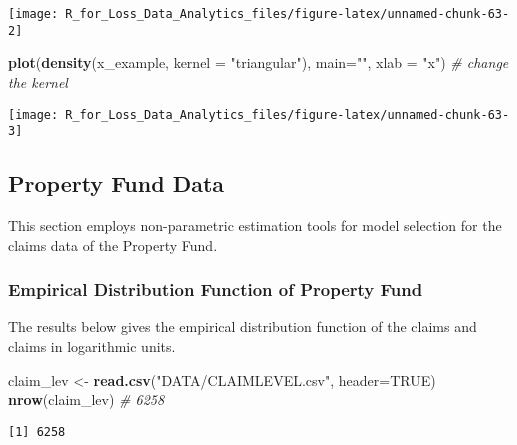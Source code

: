 \documentclass[]{book}
\newenvironment{Shaded}{\begin{snugshade}}{\end{snugshade}}
\newcommand{\KeywordTok}[1]{\textcolor[rgb]{0.13,0.29,0.53}{\textbf{#1}}}
\newcommand{\DataTypeTok}[1]{\textcolor[rgb]{0.13,0.29,0.53}{#1}}
\newcommand{\StringTok}[1]{\textcolor[rgb]{0.31,0.60,0.02}{#1}}
\newcommand{\CommentTok}[1]{\textcolor[rgb]{0.56,0.35,0.01}{\textit{#1}}}
\newcommand{\OtherTok}[1]{\textcolor[rgb]{0.56,0.35,0.01}{#1}}
\newcommand{\NormalTok}[1]{#1}
\theoremstyle{definition}
\theoremstyle{definition}
\theoremstyle{definition}
\theoremstyle{remark}
\begin{document}
\begin{center}\texttt{[image: R\_for\_Loss\_Data\_Analytics\_files/figure-latex/unnamed-chunk-63-2]} \end{center}

\begin{Shaded}
\begin{Highlighting}[]
\KeywordTok{plot}\NormalTok{(}\KeywordTok{density}\NormalTok{(x_example, }\DataTypeTok{kernel =} \StringTok{"triangular"}\NormalTok{), }\DataTypeTok{main=}\StringTok{""}\NormalTok{, }\DataTypeTok{xlab =} \StringTok{"x"}\NormalTok{)  }\CommentTok{# change the kernel}
\end{Highlighting}
\end{Shaded}

\begin{center}\texttt{[image: R\_for\_Loss\_Data\_Analytics\_files/figure-latex/unnamed-chunk-63-3]} \end{center}

\subsection{Property Fund Data}\label{property-fund-data}

This section employs non-parametric estimation tools for model selection
for the claims data of the Property Fund.

\subsubsection{Empirical Distribution Function of Property
Fund}\label{empirical-distribution-function-of-property-fund}

The results below gives the empirical distribution function of the
claims and claims in logarithmic units.

\begin{Shaded}
\begin{Highlighting}[]
\NormalTok{claim_lev <-}\StringTok{ }\KeywordTok{read.csv}\NormalTok{(}\StringTok{"DATA/CLAIMLEVEL.csv"}\NormalTok{, }\DataTypeTok{header=}\OtherTok{TRUE}\NormalTok{)}
\KeywordTok{nrow}\NormalTok{(claim_lev)  }\CommentTok{# 6258}
\end{Highlighting}
\end{Shaded}

\begin{verbatim}
[1] 6258
\end{verbatim}
\end{document}
